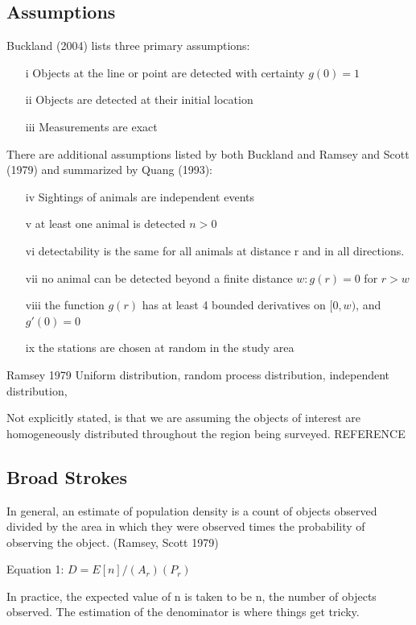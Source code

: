 \documentclass[12pt]{article}
\begin{document}
\subsection{Assumptions}
Buckland (2004) lists three primary assumptions:
\begin{enumerate}
\item[i] Objects at the line or point are detected with certainty $g(0)=1$
\item[ii] Objects are detected at their initial location
\item[iii] Measurements are exact
\end{enumerate}

There are additional assumptions listed by both Buckland and Ramsey and Scott (1979) and summarized by Quang (1993):
\begin{enumerate}
\item[iv] Sightings of animals are independent events
\item[v] at least one animal is detected $n > 0$
\item[vi] detectability is the same for all animals at distance r and in all directions.
\item[vii] no animal can be detected beyond a finite distance $w: g(r) = 0$ for $r > w$
\item[viii] the function $g(r)$ has at least 4 bounded derivatives on $[0, w)$, and $g'(0)=0$
\item[ix] the stations are chosen at random in the study area
\end{enumerate}

Ramsey 1979
Uniform distribution, random process distribution, independent distribution, 

Not explicitly stated, is that we are assuming the objects of interest are homogeneously distributed throughout the region being surveyed. REFERENCE

\subsection{Broad Strokes}
In general, an estimate of population density is a count of objects observed divided by the area in which they were observed times the probability of observing the object. (Ramsey, Scott 1979)

Equation 1: $D = E[n]/(A_r)(P_r)$

In practice, the expected value of n is taken to be n, the number of objects observed. The estimation of the denominator is where things get tricky.
\end{document}
